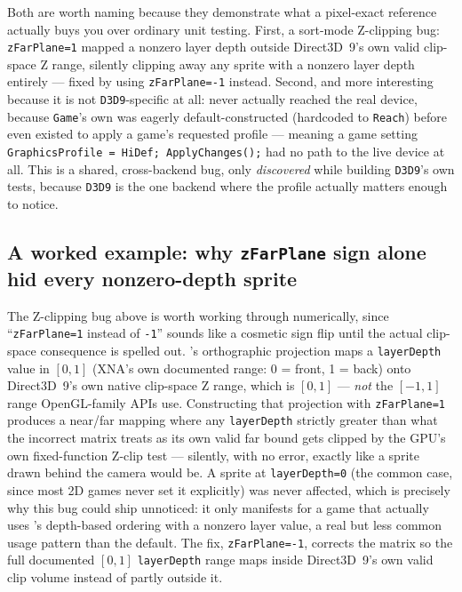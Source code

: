 Both are worth naming because they demonstrate what a pixel-exact reference actually buys
you over ordinary unit testing. First, a sort-mode Z-clipping bug: \texttt{zFarPlane=1}
mapped a nonzero  layer depth outside Direct3D~9's own valid clip-space
Z range, silently clipping away any sprite with a nonzero layer depth entirely --- fixed by
using \texttt{zFarPlane=-1} instead. Second, and more interesting because it is not
\texttt{D3D9}-specific at all:  never actually reached the real
device, because \texttt{Game}'s own  was eagerly default-constructed
(hardcoded to \texttt{Reach}) before  even existed to apply a
game's requested profile --- meaning a game setting \texttt{GraphicsProfile = HiDef;
ApplyChanges();} had no path to the live device at all. This is a shared, cross-backend bug,
only \emph{discovered} while building \texttt{D3D9}'s own tests, because \texttt{D3D9} is the
one backend where the profile actually matters enough to notice.

\subsection{A worked example: why \texttt{zFarPlane} sign alone hid every nonzero-depth sprite}

The Z-clipping bug above is worth working through numerically, since ``\texttt{zFarPlane=1}
instead of \texttt{-1}'' sounds like a cosmetic sign flip until the actual clip-space
consequence is spelled out. 's orthographic projection maps a
\texttt{layerDepth} value in $[0, 1]$ (XNA's own documented range: 0 = front, 1 = back) onto
Direct3D~9's own native clip-space Z range, which is $[0, 1]$ --- \emph{not} the
$[-1, 1]$ range OpenGL-family APIs use. Constructing that projection with
\texttt{zFarPlane=1} produces a near/far mapping where any \texttt{layerDepth} strictly
greater than what the incorrect matrix treats as its own valid far bound gets clipped by the
GPU's own fixed-function Z-clip test --- silently, with no error, exactly like a sprite drawn
behind the camera would be. A sprite at \texttt{layerDepth=0} (the common case, since most
2D games never set it explicitly) was never affected, which is precisely why this bug could
ship unnoticed: it only manifests for a game that actually uses 's
depth-based ordering with a nonzero layer value, a real but less common 
usage pattern than the default. The fix, \texttt{zFarPlane=-1}, corrects the matrix so the
full documented $[0,1]$ \texttt{layerDepth} range maps inside Direct3D~9's own valid clip
volume instead of partly outside it.

